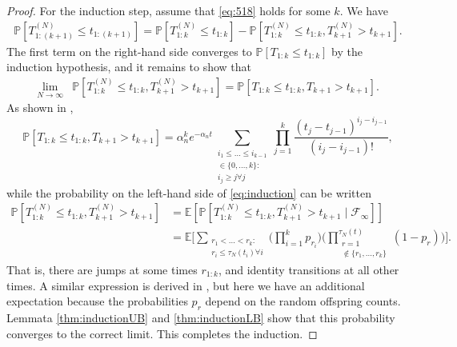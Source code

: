 \documentclass[12pt,authoryear]{article}
\theoremstyle{definition}
\newcommand{\Prob}{\mathbb{P}}
\newcommand{\E}{\mathbb{E}}
\newcommand{\1}[1]{\mathbbm{1}_{#1}}
\begin{document}
\begin{proof}
For the induction step, assume that \eqref{eq:518} holds for some $k$. 
We have
\begin{align*}
\Prob\left[ T_{ 1 : ( k + 1 ) }^{(N)} \leq t_{ 1 : ( k + 1 ) } \right]
= \Prob\left[ T_{ 1 : k }^{(N)} \leq t_{ 1 : k } \right] - \Prob\left[ T_{ 1 :  k }^{(N)} \leq t_{ 1 : k }, T_{k+1}^{(N)} > t_{k+1} \right].
\end{align*}
The first term on the right-hand side converges to $\Prob[ T_{ 1 : k } \leq t_{ 1 : k } ]$ by the induction hypothesis, and it remains to show that
\begin{align}
\lim_{N\to\infty} 
        &\Prob\left[ T_{ 1 : k }^{(N)} \leq t_{ 1 : k }, T_{k+1}^{(N)} > t_{k+1} \right] = \Prob[ T_{ 1 : k }\leq t_{ 1 : k }, T_{k+1} > t_{k+1} ]. \label{eq:induction}
\end{align}
As shown in \citet[p.\ 459]{mohle1999},
\begin{equation*}
\Prob[ T_{ 1 : k }\leq t_{ 1 : k }, T_{k+1} > t_{k+1} ]
= \alpha_n^k e^{-\alpha_n t} 
        \sum_{\substack{i_1\leq \dots\leq i_{k-1}\\ \in \{0,\dots,k\} :
        \\ i_j \geq j \forall j}} 
        \prod_{j=1}^k \frac{(t_j - t_{j-1})^{i_j - i_{j-1}}}{(i_j - i_{j-1})! } ,
\end{equation*}
while the probability on the left-hand side of \eqref{eq:induction} can be written
\begin{align*}
\Prob\left[ T_{ 1 : k }^{(N)} \leq t_{ 1 : k }, T_{k+1}^{(N)} > t_{k+1} \right] &= \E\left[ \Prob[ T_{ 1 : k }^{(N)} \leq t_{ 1 : k }, T_{k+1}^{(N)} > t_{k+1} 
        \mid \mathcal{F}_\infty] \right] \\
&= \E \Bigg[ \sum_{\substack{r_1 <\dots< r_k :
        \\ r_i \leq \tau_N(t_i) \forall i}}
        \Big( \prod_{i=1}^k p_{r_i} \Big)
        \Bigg( \prod_{\substack{r=1 \\ \notin \{r_1,\dots,r_k\} }}^{\tau_N(t)} 
        (1-p_r) \Bigg) \Bigg] .
\end{align*}
That is, there are jumps at some times $r_{ 1 : k }$, and identity transitions at all other times.
A similar expression is derived in \citet{mohle1999}, but here we have an additional expectation because the probabilities $p_r$ depend on the random offspring counts.
Lemmata \ref{thm:inductionUB} and \ref{thm:inductionLB} show that this probability converges to the correct limit.
This completes the induction.
\end{proof}
\end{document}
